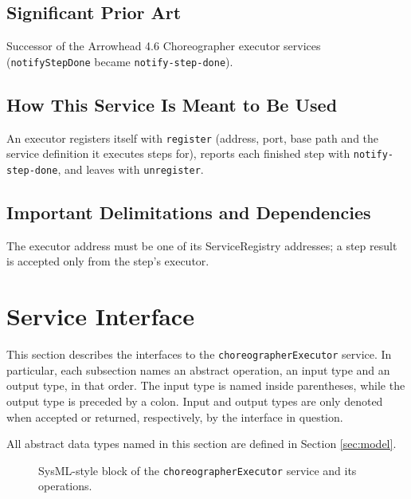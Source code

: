 \documentclass[a4paper]{arrowhead}
\begin{document}
\subsection{Significant Prior Art}

Successor of the Arrowhead 4.6 Choreographer executor services (\texttt{notifyStepDone} became \texttt{notify-\allowbreak{}step-\allowbreak{}done}).

\subsection{How This Service Is Meant to Be Used}

An executor registers itself with \texttt{register} (address, port, base path and the service definition it executes steps for), reports each finished step with \texttt{notify-\allowbreak{}step-\allowbreak{}done}, and leaves with \texttt{unregister}.

\subsection{Important Delimitations and Dependencies}
\label{sec:delimitations}

The executor address must be one of its ServiceRegistry addresses; a step result is accepted only from the step's executor.

\newpage

\section{Service Interface}
\label{sec:operations}

This section describes the interfaces to the \texttt{choreographer\allowbreak{}Executor} service.
In particular, each subsection names an abstract operation, an input type and an output type, in that order.
The input type is named inside parentheses, while the output type is preceded by a colon.
Input and output types are only denoted when accepted or returned, respectively, by the interface in question.

All abstract data types named in this section are defined in Section \ref{sec:model}.

\begin{figure}[ht!]
  \centering
  \caption{SysML-style block of the \texttt{choreographer\allowbreak{}Executor} service and its operations.}
  \label{fig:SD}
\end{figure}
\end{document}
